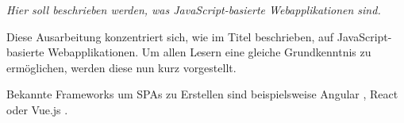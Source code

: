\textit{Hier soll beschrieben werden, was JavaScript-basierte Webapplikationen sind.}

Diese Ausarbeitung konzentriert sich, wie im Titel beschrieben, auf JavaScript-basierte Webapplikationen. Um allen Lesern eine gleiche Grundkenntnis zu ermöglichen, werden diese nun kurz vorgestellt.

{\color{red}\textit{\lipsum[1]}}

Bekannte Frameworks um SPAs zu Erstellen sind beispielsweise Angular \cite{AngularHomepage}, React \cite{ReactHomepage} oder Vue.js \cite{VueJSHomepage}.